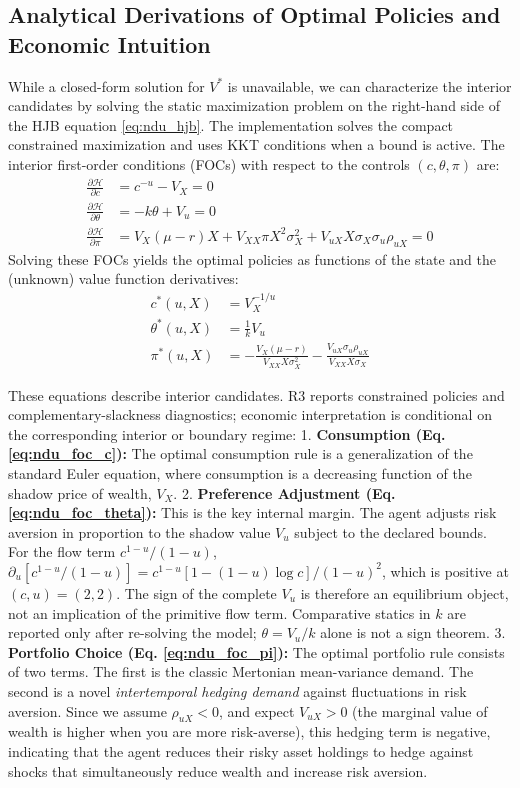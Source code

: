 \documentclass[ecta]{econsocart}
\theoremstyle{plain}
\theoremstyle{remark}
\begin{document}
\subsection{Analytical Derivations of Optimal Policies and Economic Intuition}
While a closed-form solution for $V^*$ is unavailable, we can characterize the interior candidates by solving the static maximization problem on the right-hand side of the HJB equation \eqref{eq:ndu_hjb}. The implementation solves the compact constrained maximization and uses KKT conditions when a bound is active. The interior first-order conditions (FOCs) with respect to the controls $(c, \theta, \pi)$ are:
\begin{align}
\frac{\partial \mathcal{H}}{\partial c} &= c^{-u} - V_X = 0 \\
\frac{\partial \mathcal{H}}{\partial \theta} &= -k\theta + V_u = 0 \\
\frac{\partial \mathcal{H}}{\partial \pi} &= V_X(\mu-r)X + V_{XX}\pi X^2 \sigma_X^2 + V_{uX} X \sigma_X \sigma_u \rho_{uX} = 0
\end{align}
Solving these FOCs yields the optimal policies as functions of the state and the (unknown) value function derivatives:
\begin{align}
c^*(u, X) &= V_X^{-1/u} \label{eq:ndu_foc_c} \\
\theta^*(u, X) &= \frac{1}{k} V_u \label{eq:ndu_foc_theta} \\
\pi^*(u, X) &= -\frac{V_X(\mu-r)}{V_{XX}X\sigma_X^2} - \frac{V_{uX}\sigma_u \rho_{uX}}{V_{XX}X\sigma_X} \label{eq:ndu_foc_pi}
\end{align}

These equations describe interior candidates. R3 reports constrained policies and complementary-slackness diagnostics; economic interpretation is conditional on the corresponding interior or boundary regime:
1.  \textbf{Consumption (Eq. \ref{eq:ndu_foc_c}):} The optimal consumption rule is a generalization of the standard Euler equation, where consumption is a decreasing function of the shadow price of wealth, $V_X$.
2.  \textbf{Preference Adjustment (Eq. \ref{eq:ndu_foc_theta}):} This is the key internal margin. The agent adjusts risk aversion in proportion to the shadow value $V_u$ subject to the declared bounds. For the flow term $c^{1-u}/(1-u)$, $\partial_u[c^{1-u}/(1-u)]=c^{1-u}[1-(1-u)\log c]/(1-u)^2$, which is positive at $(c,u)=(2,2)$. The sign of the complete $V_u$ is therefore an equilibrium object, not an implication of the primitive flow term. Comparative statics in $k$ are reported only after re-solving the model; $\theta=V_u/k$ alone is not a sign theorem.
3.  \textbf{Portfolio Choice (Eq. \ref{eq:ndu_foc_pi}):} The optimal portfolio rule consists of two terms. The first is the classic Mertonian mean-variance demand. The second is a novel \textit{intertemporal hedging demand} against fluctuations in risk aversion. Since we assume $\rho_{uX} < 0$, and expect $V_{uX} > 0$ (the marginal value of wealth is higher when you are more risk-averse), this hedging term is negative, indicating that the agent reduces their risky asset holdings to hedge against shocks that simultaneously reduce wealth and increase risk aversion.
\end{document}

